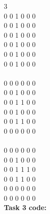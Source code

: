 \documentclass[11pt]{amsart}
\begin{document}
3	\\
0 0 1 0 0 0 \\
0 0 1 0 0 0 \\
0 0 1 0 0 0 \\
0 0 1 0 0 0 \\
0 0 1 0 0 0 \\
0 0 1 0 0 0 \\
\\
0 0 0 0 0 0 \\
0 0 1 0 0 0 \\
0 0 1 1 0 0 \\
0 0 1 0 0 0 \\
0 0 1 1 0 0 \\
0 0 0 0 0 0 \\
\\
0 0 0 0 0 0 \\
0 0 1 0 0 0 \\
0 0 1 1 1 0 \\
0 0 1 1 0 0 \\
0 0 0 0 0 0 \\
0 0 0 0 0 0 \\


\textbf{Task 3 code:}
\end{document}
